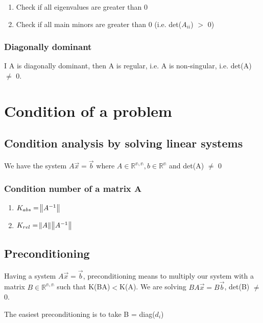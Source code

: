\documentclass[a4paper, 12pt]{article}
\begin{document}
\begin{enumerate}
	\item Check if all eigenvalues are greater than 0
	\item Check if all main minors are greater than 0 (i.e. det($A_{ii}$) $>$ 0)
\end{enumerate}

\subsubsection{Diagonally dominant}
I A is diagonally dominant, then A is regular, i.e. A is non-singular, i.e. det(A) $\neq$ 0.

\section{Condition of a problem}
\subsection{Condition analysis by solving linear systems}

We have the system $A\overrightarrow{x} = \overrightarrow{b}$ where $A \in \mathbb{R^{n,n}}, b \in \mathbb{R^n}$ and det(A) $\neq$ 0

\subsubsection{Condition number of a matrix A}
\begin{enumerate}
	\item $K_{abs} = \norm{A^{-1}}$
	\item$ K_{rel} = \norm{A}\norm{A^{-1}}$
\end{enumerate}

\subsection{Preconditioning}
Having a system $A\overrightarrow{x} = \overrightarrow{b}$, preconditioning means to multiply our system with a matrix $B \in \mathbb{R^{n,n}}$ such that K(BA)$<$K(A). We are solving $BA\overrightarrow{x} = B\overrightarrow{b}$, det(B) $\neq$ 0.\newline

The easiest preconditioning is to take B = diag($d_i$)
\end{document}
